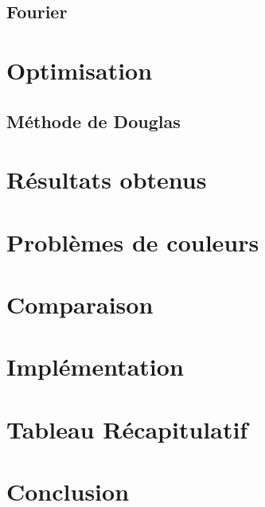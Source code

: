 \documentclass{article}
\begin{document}
\subsection{Fourier \cite{Image}}

\section{Optimisation}
\subsection{Méthode de Douglas \cite{Douglas}}

\section{Résultats obtenus}

\section{Problèmes de couleurs}

\section{Comparaison}

\section{Implémentation}

\section{Tableau Récapitulatif}

\section{Conclusion}



\end{document}
